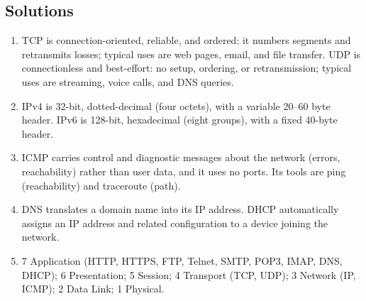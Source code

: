 \documentclass[11pt]{article}
\begin{document}
\subsection*{Solutions}
\begingroup\small
\begin{enumerate}[label=\arabic*.]
  \item TCP is connection-oriented, reliable, and ordered: it numbers
    segments and retransmits losses; typical uses are web pages, email, and
    file transfer. UDP is connectionless and best-effort: no setup, ordering,
    or retransmission; typical uses are streaming, voice calls, and DNS
    queries.
  \item IPv4 is 32-bit, dotted-decimal (four octets), with a variable 20--60
    byte header. IPv6 is 128-bit, hexadecimal (eight groups), with a fixed
    40-byte header.
  \item ICMP carries control and diagnostic messages about the network
    (errors, reachability) rather than user data, and it uses no ports. Its
    tools are ping (reachability) and traceroute (path).
  \item DNS translates a domain name into its IP address. DHCP automatically
    assigns an IP address and related configuration to a device joining the
    network.
  \item 7 Application (HTTP, HTTPS, FTP, Telnet, SMTP, POP3, IMAP, DNS,
    DHCP); 6 Presentation; 5 Session; 4 Transport (TCP, UDP); 3 Network (IP,
    ICMP); 2 Data Link; 1 Physical.
\end{enumerate}
\endgroup
\end{document}
